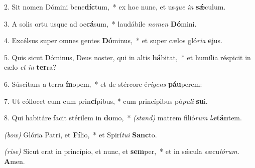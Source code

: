 2. Sit nomen Dómini bene\textbf{díc}tum,~*
	ex hoc nunc, et us\textit{que} \textit{in} \textbf{s\'{\ae}}culum.

3. A solis ortu usque ad oc\textbf{cá}sum,~*
	laudábile \textit{no}\textit{men} \textbf{Dó}mini.

4. Excélsus super omnes gentes \textbf{Dó}minus,~*
	et super cælos gló\textit{ri}\textit{a} \textbf{e}jus.

5. Quis sicut Dóminus, Deus noster, qui in altis \textbf{há}bitat,~*
	et humília réspicit in cælo \textit{et} \textit{in} \textbf{ter}ra?

6. Súscitans a terra \textbf{ín}opem,~*
	et de stércore é\textit{ri}\textit{gens} \textbf{páu}perem:

7. Ut cóllocet eum cum prin\textbf{cí}pibus, *
	cum princípibus pó\textit{pu}\textit{li} \textbf{su}i.

8. Qui habitáre facit stérilem in \textbf{do}mo,~* {\color{red}\textit{(stand)}}
	matrem filió\textit{rum} \textit{læ}\textbf{tán}tem.

{\color{red}\textit{(bow)}} Glória Patri, et \textbf{Fí}lio,~*
	et Spirí\textit{tu}\textit{i} \textbf{Sanc}to.

{\color{red}\textit{(rise)}} Sicut erat in princípio, et nunc, et \textbf{sem}per,~*
	et in s\'{\ae}cula sæcu\textit{ló}\textit{rum}. \textbf{A}men.